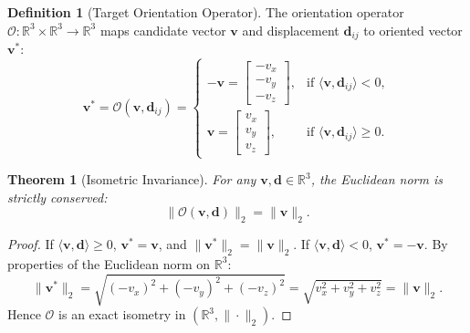 \documentclass[11pt,a4paper]{article}
\theoremstyle{plain}
\newtheorem{theorem}{Theorem}
\theoremstyle{definition}
\newtheorem{definition}{Definition}
\begin{document}
\begin{definition}[Target Orientation Operator]
The orientation operator $\mathcal{O}: \mathbb{R}^3 \times \mathbb{R}^3 \to \mathbb{R}^3$ maps candidate vector $\mathbf{v}$ and displacement $\mathbf{d}_{ij}$ to oriented vector $\mathbf{v}^*$:
\begin{equation}
    \mathbf{v}^* = \mathcal{O}(\mathbf{v}, \mathbf{d}_{ij}) = 
    \begin{cases}
        -\mathbf{v} = \begin{bmatrix} -v_x \\ -v_y \\ -v_z \end{bmatrix}, & \text{if } \langle \mathbf{v}, \mathbf{d}_{ij} \rangle < 0, \\[10pt]
        \mathbf{v} = \begin{bmatrix} v_x \\ v_y \\ v_z \end{bmatrix}, & \text{if } \langle \mathbf{v}, \mathbf{d}_{ij} \rangle \ge 0.
    \end{cases}
\end{equation}
\end{definition}

\begin{theorem}[Isometric Invariance]
For any $\mathbf{v}, \mathbf{d} \in \mathbb{R}^3$, the Euclidean norm is strictly conserved:
\begin{equation}
    \|\mathcal{O}(\mathbf{v}, \mathbf{d})\|_2 = \|\mathbf{v}\|_2.
\end{equation}
\end{theorem}
\begin{proof}
If $\langle \mathbf{v}, \mathbf{d} \rangle \ge 0$, $\mathbf{v}^* = \mathbf{v}$, and $\|\mathbf{v}^*\|_2 = \|\mathbf{v}\|_2$. If $\langle \mathbf{v}, \mathbf{d} \rangle < 0$, $\mathbf{v}^* = -\mathbf{v}$. By properties of the Euclidean norm on $\mathbb{R}^3$:
\begin{equation}
    \|\mathbf{v}^*\|_2 = \sqrt{(-v_x)^2 + (-v_y)^2 + (-v_z)^2} = \sqrt{v_x^2 + v_y^2 + v_z^2} = \|\mathbf{v}\|_2.
\end{equation}
Hence $\mathcal{O}$ is an exact isometry in $(\mathbb{R}^3, \|\cdot\|_2)$.
\end{proof}
\end{document}

